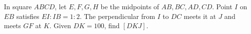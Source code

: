 In square $ABCD$, let $E,F,G,H$ be the midpoints of $AB,BC,AD,CD$. Point $I$ on $EB$ satisfies $EI:IB=1:2$. The perpendicular from $I$ to $DC$ meets it at $J$ and meets $GF$ at $K$. Given $DK=100$, find $[DKJ]$.
